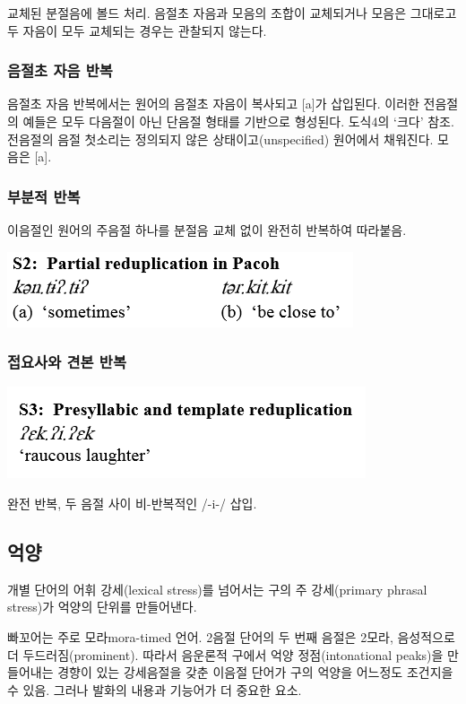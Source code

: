 교체된 분절음에 볼드 처리. 음절초 자음과 모음의 조합이 교체되거나 모음은 그대로고 두 자음이 모두 교체되는 경우는 관찰되지 않는다.

\subsubsection{음절초 자음 반복}
음절초 자음 반복에서는 원어의 음절초 자음이 복사되고 [a]가 삽입된다. 이러한 전음절의 예들은 모두 다음절이 아닌 단음절 형태를 기반으로 형성된다. 도식4의 `크다' 참조. 전음절의 음절 첫소리는 정의되지 않은 상태이고(unspecified) 원어에서 채워진다. 모음은 [a].

\subsubsection{부분적 반복}
이음절인 원어의 주음절 하나를 분절음 교체 없이 완전히 반복하여 따라붙음. 

\includegraphics{Pacoh/src/PacohS2.png}

\subsubsection{접요사와 견본 반복}
\includegraphics{Pacoh/src/PacohS3.png}

완전 반복, 두 음절 사이 비-반복적인 /-i-/ 삽입.

\subsection{억양}
개별 단어의 어휘 강세(lexical stress)를 넘어서는 구의 주 강세(primary phrasal stress)가 억양의 단위를 만들어낸다.

빠꼬어는 주로 모라mora-timed 언어. 2음절 단어의 두 번째 음절은 2모라, 음성적으로 더 두드러짐(prominent). 따라서 음운론적 구에서 억양 정점(intonational peaks)을 만들어내는 경향이 있는 강세음절을 갖춘 이음절 단어가 구의 억양을 어느정도 조건지을 수 있음. 그러나 발화의 내용과 기능어가 더 중요한 요소.

